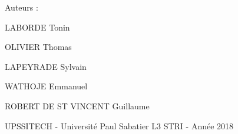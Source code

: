 Auteurs \+:
\begin{DoxyItemize}
\item L\+A\+B\+O\+R\+DE Tonin
\item O\+L\+I\+V\+I\+ER Thomas
\item L\+A\+P\+E\+Y\+R\+A\+DE Sylvain
\item W\+A\+T\+H\+O\+JE Emmanuel
\item R\+O\+B\+E\+RT DE ST V\+I\+N\+C\+E\+NT Guillaume
\end{DoxyItemize}

U\+P\+S\+S\+I\+T\+E\+CH -\/ Université Paul Sabatier L3 S\+T\+RI -\/ Année 2018 